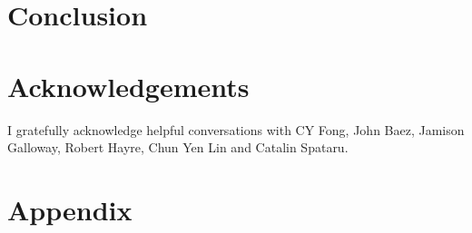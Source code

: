 \documentclass[11pt, oneside]{article}   	%
\begin{document}



\section{Conclusion}
\section{Acknowledgements}
I gratefully acknowledge helpful conversations with CY Fong, John Baez, Jamison Galloway, Robert Hayre, Chun Yen Lin and Catalin Spataru.
\section{Appendix}
\end{document}
